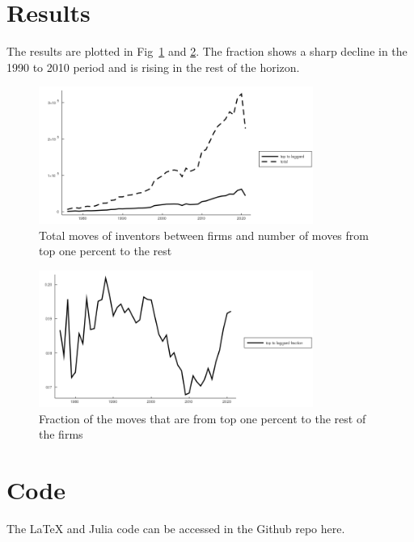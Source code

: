 \documentclass{report}
\numberwithin{equation}{section}
\numberwithin{figure}{section}
\numberwithin{table}{section}
\begin{document}
\section{Results}

The results are plotted in Fig~\ref{fig:f1} and \ref{fig:f2}. The fraction shows a sharp decline in the 1990 to 2010 period and is rising in the rest of the horizon. 
\begin{figure}
    \centering
    \includegraphics[width = 0.8\textwidth]{input/total_moves.png}
    \caption{Total moves of inventors between firms and number of moves from top one percent to the rest}
    \label{fig:f1}
\end{figure}

\begin{figure}
    \centering
    \includegraphics[width = 0.8\textwidth]{input/fraction.png}
    \caption{Fraction of the moves that are from top one percent to the rest of the firms}
    \label{fig:f2}
\end{figure}

\section{Code}

The LaTeX and Julia code can be accessed in the Github repo here.

\end{document}
